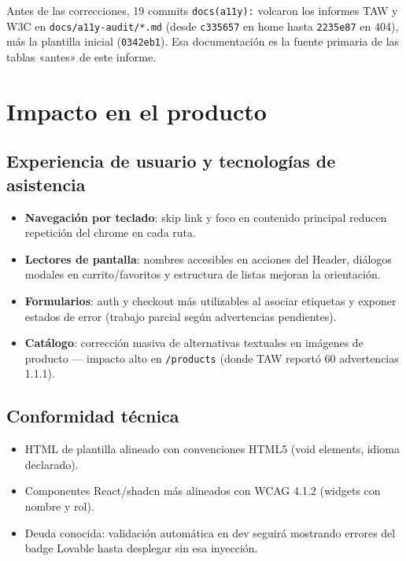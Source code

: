 \documentclass[11pt,a4paper]{article}
\begin{document}
Antes de las correcciones, 19 commits \texttt{docs(a11y):} volcaron los informes TAW y W3C en \texttt{docs/a11y-audit/*.md} (desde \texttt{c335657} en home hasta \texttt{2235e87} en 404), más la plantilla inicial (\texttt{0342eb1}). Esa documentación es la fuente primaria de las tablas «antes» de este informe.

\section{Impacto en el producto}

\subsection{Experiencia de usuario y tecnologías de asistencia}

\begin{itemize}[noitemsep]
  \item \textbf{Navegación por teclado}: skip link y foco en contenido principal reducen repetición del chrome en cada ruta.
  \item \textbf{Lectores de pantalla}: nombres accesibles en acciones del Header, diálogos modales en carrito/favoritos y estructura de listas mejoran la orientación.
  \item \textbf{Formularios}: auth y checkout más utilizables al asociar etiquetas y exponer estados de error (trabajo parcial según advertencias pendientes).
  \item \textbf{Catálogo}: corrección masiva de alternativas textuales en imágenes de producto --- impacto alto en \texttt{/products} (donde TAW reportó 60 advertencias 1.1.1).
\end{itemize}

\subsection{Conformidad técnica}

\begin{itemize}[noitemsep]
  \item HTML de plantilla alineado con convenciones HTML5 (void elements, idioma declarado).
  \item Componentes React/shadcn más alineados con WCAG 4.1.2 (widgets con nombre y rol).
  \item Deuda conocida: validación automática en dev seguirá mostrando errores del badge Lovable hasta desplegar sin esa inyección.
\end{itemize}
\end{document}
